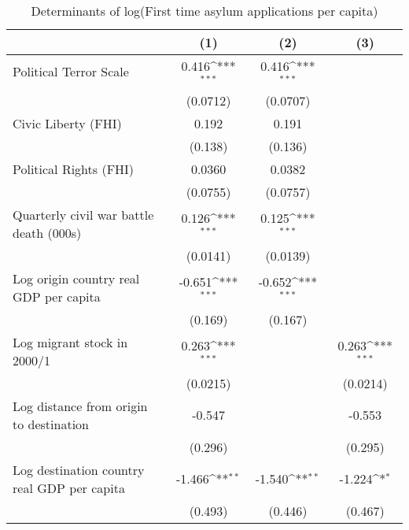 \begin{table}[htbp]\centering
\def\sym#1{\ifmmode^{#1}\else\(^{#1}\)\fi}
\caption{Determinants of log(First time asylum applications per capita)}
\begin{tabular}{l*{3}{c}}
\hline\hline
                    &\multicolumn{1}{c}{(1)}         &\multicolumn{1}{c}{(2)}         &\multicolumn{1}{c}{(3)}         \\
\hline
Political Terror Scale&       0.416\sym{***}&       0.416\sym{***}&                     \\
                    &    (0.0712)         &    (0.0707)         &                     \\
[1em]
Civic Liberty (FHI) &       0.192         &       0.191         &                     \\
                    &     (0.138)         &     (0.136)         &                     \\
[1em]
Political Rights (FHI)&      0.0360         &      0.0382         &                     \\
                    &    (0.0755)         &    (0.0757)         &                     \\
[1em]
Quarterly civil war battle death (000s)&       0.126\sym{***}&       0.125\sym{***}&                     \\
                    &    (0.0141)         &    (0.0139)         &                     \\
[1em]
Log origin country real GDP per capita&      -0.651\sym{***}&      -0.652\sym{***}&                     \\
                    &     (0.169)         &     (0.167)         &                     \\
[1em]
Log migrant stock in 2000/1&       0.263\sym{***}&                     &       0.263\sym{***}\\
                    &    (0.0215)         &                     &    (0.0214)         \\
[1em]
Log distance from origin to destination&      -0.547         &                     &      -0.553         \\
                    &     (0.296)         &                     &     (0.295)         \\
[1em]
Log destination country real GDP per capita&      -1.466\sym{**} &      -1.540\sym{**} &      -1.224\sym{*}  \\
                    &     (0.493)         &     (0.446)         &     (0.467)         \\

\end{tabular}
\end{table}
